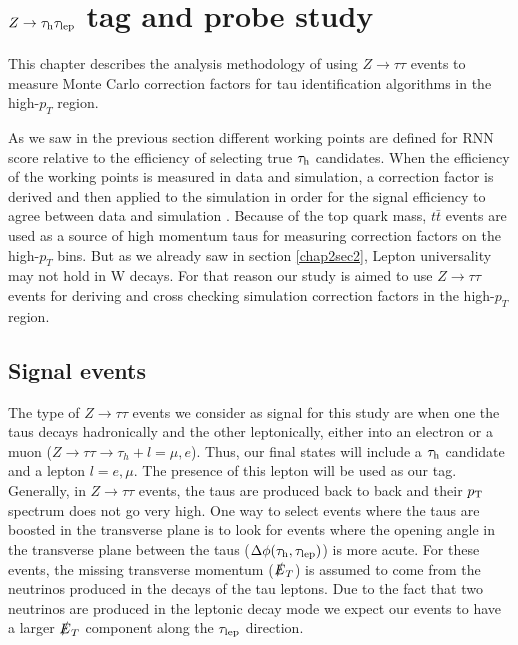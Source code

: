 \chapter{$Z\to\tau_\text{h}\tau_\text{lep}$ tag and probe study}\label{chap4}
This chapter describes the analysis methodology of using $Z\to\tau\tau$ events to measure Monte Carlo correction factors for tau identification algorithms in the high-$p_T$ region.

As we saw in the previous section different working points are defined for RNN score relative to the efficiency of selecting true $\tau_\text{h}$ candidates. When the efficiency of the working points is measured in data and simulation, a correction factor is derived and then applied to the simulation in order for the signal efficiency to agree between data and simulation \cite{ATLAS:2017mpa}. Because of the top quark mass, $t\bar{t}$ events are used as a source of high momentum taus for measuring correction factors on the high-$p_T$ bins. But as we already saw in section \ref{chap2sec2}, Lepton universality may not hold in W decays. For that reason our study is aimed to use $Z\to\tau\tau$ events for deriving and cross checking simulation correction factors in the high-$p_T$ region.   

\section{Signal events}\label{chap4sec1}
The type of $Z\to\tau\tau$ events we consider as signal for this study are when one the taus decays hadronically and the other leptonically, either into an electron or a muon ($Z\to\tau\tau\to\tau_h +l=\mu,e$). Thus, our final states will include a $\tau_\text{h}$ candidate and a lepton $l=e,\mu$. The presence of this lepton will be used as our tag. 
Generally, in $Z\to\tau\tau$ events, the taus are produced back to back and their $p_\text{T}$ spectrum does not go very high. One way to select events where the taus are boosted in the transverse plane is to look for events where the opening angle in the transverse plane between the taus ($\Delta\phi(\tau_\text{h},\tau_\text{lep})$) is more acute. For these events, the missing transverse momentum ($\slashed{E}_T$) is assumed to come from the neutrinos produced in the decays of the tau leptons. Due to the fact that two neutrinos are produced in the leptonic decay mode we expect our events to have a larger $\slashed{E}_T$ component along the $\tau_\text{lep}$ direction.

